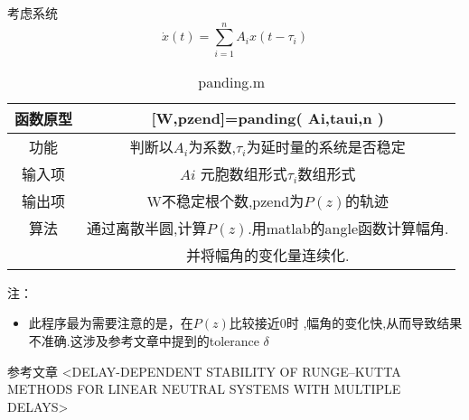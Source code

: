 \documentclass[11pt,twoside,a4paper]{article}
\begin{document}
考虑系统
$$\dot{x}(t)=\sum_{i=1}^{n}A_ix(t-\tau_i)$$



\begin{table}[htbp]
\caption{panding.m}  %
	\label{table1}  %
	\begin{tabular}{|c|c|} 
\hline
函数原型& [W,pzend]=panding( Ai,taui,n  )\\
\hline
功能& 判断以$A_i$为系数,$\tau_i$为延时量的系统是否稳定\\
\hline
输入项& $Ai$ 元胞数组形式$\tau_i$数组形式\\
\hline
输出项&W不稳定根个数,pzend为$P(z)$的轨迹\\
\hline
算法&通过离散半圆,计算$P(z)$.用matlab的angle函数计算幅角.\\
&并将幅角的变化量连续化.\\
\hline
\end{tabular}
\end{table}
注：
\begin{itemize}
\item 此程序最为需要注意的是，在$P(z)$比较接近$0$时 ,幅角的变化快,从而导致结果不准确.这涉及参考文章中提到的tolerance $δ$
\end{itemize}

参考文章
<DELAY-DEPENDENT STABILITY OF RUNGE–KUTTA
METHODS FOR LINEAR NEUTRAL SYSTEMS
WITH MULTIPLE DELAYS>
\end{document}
